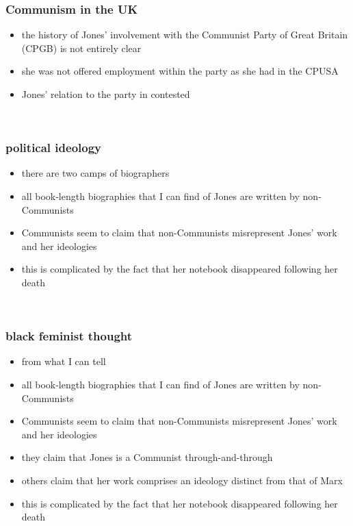 \documentclass{beamer} %
\theoremstyle{definition} %
\begin{document}
\begin{frame} 
	\frametitle{Communism in the UK}
	\begin{itemize}
		\item the history of Jones' involvement with the Communist Party of Great Britain (CPGB) is not entirely clear
		\item she was not offered employment within the party as she had in the CPUSA
		\item Jones' relation to the party in contested
	\end{itemize}

	\vfill
	\ \hfill \citep{LalkarP}
\end{frame}

\begin{frame} 
	\frametitle{political ideology}
	\begin{itemize}
		\item there are two camps of biographers
		\item all book-length biographies that I can find of Jones are written by non-Communists
		\item Communists seem to claim that non-Communists misrepresent Jones' work and her ideologies
		\item this is complicated by the fact that her notebook disappeared following her death
	\end{itemize}

	\vfill
	\ \hfill \citep{LalkarP}
\end{frame}

\begin{frame} 
	\frametitle{black feminist thought}
	\begin{itemize}
		\item from what I can tell
		\item all book-length biographies that I can find of Jones are written by non-Communists
		\item Communists seem to claim that non-Communists misrepresent Jones' work and her ideologies
		\item they claim that Jones is a Communist through-and-through
		\item others claim that her work comprises an ideology distinct from that of Marx
		\item this is complicated by the fact that her notebook disappeared following her death
	\end{itemize}

	\vfill
	\ \hfill \citep{LalkarP}
\end{frame}
\end{document}
